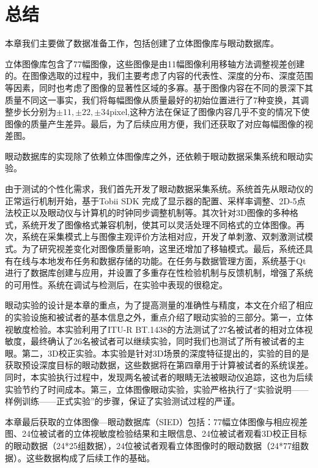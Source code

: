 \section{总结}
\label{sec:conclusionchapter3}
本章我们主要做了数据准备工作，包括创建了立体图像库与眼动数据库。

立体图像库包含了77幅图像，这些图像是由11幅图像利用移轴方法调整视差创建的。在图像选取的过程中，我们主要考虑了内容的代表性、深度的分布、深度范围等因素，同时也考虑了图像的显著性区域的多寡。基于图像内容在不同的景深下其质量不同这一事实，我们将每幅图像从质量最好的初始位置进行了7种变换，其调整步长分别为$\pm 11, \pm 22, \pm 34$pixel,这种方法在保证了图像内容几乎不变的情况下使图像的质量产生差异。最后，为了后续应用方便，我们还获取了对应每幅图像的视差图。

眼动数据库的实现除了依赖立体图像库之外，还依赖于眼动数据采集系统和眼动实验。

由于测试的个性化需求，我们首先开发了眼动数据采集系统。系统首先从眼动仪的正常运行机制开始，基于Tobii SDK 完成了显示器的配置、采样率调整、2D-5点法校正以及眼动仪与计算机的时钟同步调整机制等。其次针对3D图像的多种格式，系统开发了图像格式兼容机制，使其可以灵活处理不同格式的立体图像。再次，系统在采集模式上与图像主观评价方法相对应，开发了单刺激、双刺激测试模式。为了研究视差变化对图像质量影响，这里还增加了移轴模式。最后，系统还具有在线与本地发布任务和数据存储的功能。在任务与数据管理方面，系统基于Qt进行了数据库创建与应用，并设置了多重存在性检验机制与反馈机制，增强了系统的可用性。系统在调试与检测后，在实验中表现的很稳定。

眼动实验的设计是本章的重点，为了提高测量的准确性与精度，本文在介绍了相应的实验设施和被试者的基本信息之外，重点介绍了眼动实验的三部分。第一，立体视敏度检验。本实验利用了ITU-R BT.1438的方法测试了27名被试者的相对立体视敏度，最终确认了26名被试者可以继续实验，同时我们也测试了所有被试者的主眼。第二，3D校正实验。本实验是针对3D场景的深度特征提出的，实验的目的是获取预设深度目标的眼动数据，这些数据将在第四章用于计算被试者的系统误差。同时，本实验执行过程中，发现两名被试者的眼睛无法被眼动仪追踪，这也为后续实验节约了时间成本。第三，立体图像眼动实验，实验严格执行了“实验说明——样例训练——正式实验”的步骤，保证了实验测试过程的严谨。

本章最后获取的立体图像—眼动数据库（SIED）包括：77幅立体图像与相应视差图、24位被试者的立体视敏度检验结果和主眼信息、24位被试者观看3D校正目标的眼动数据（24*25组数据），24位被试者观看立体图像时的眼动数据（24*77组数据）。这些数据构成了后续工作的基础。

